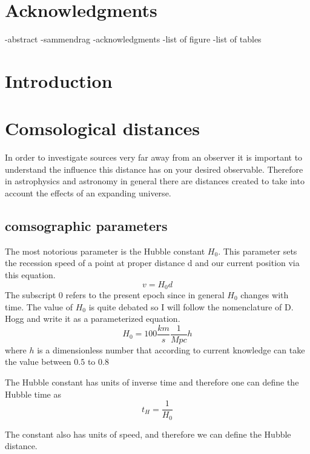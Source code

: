 \documentclass{article}
\begin{document}
\section*{Acknowledgments}
\lipsum[3] %

\newpage
\tableofcontents

\newpage
\listoffigures

\listoftables

-abstract 
-sammendrag
-acknowledgments
-list of figure
-list of tables


\section{Introduction}

\section{Comsological distances}
In order to investigate sources very far away from an observer it is important to understand the influence this distance has on your desired observable. Therefore in astrophysics and astronomy in general there are distances created to take into account the effects of an expanding universe. 


\subsection{comsographic parameters}

The most notorious parameter is the Hubble constant $H_0$. This parameter sets the recession speed of a point at proper distance d and our current position via this equation.
\begin{equation}
    v = H_0 d 
\end{equation}
The subscript $0$ refers to the present epoch since in general $H_0$ changes with time. The value of $H_0$ is quite debated so I will  follow the nomenclature of D. Hogg and write it as a parameterized equation. 
$$
H_0= 100\frac{km}{s}\frac{1}{Mpc} h 
$$
where $h$ is a dimensionless number that according to current knowledge  can take the value between $0.5$ to $0.8$  

The Hubble constant has units of inverse time and therefore one can define the Hubble time as 
$$
t_H = \frac{1}{H_0}
$$


The constant also has units of speed, and therefore we can define the Hubble distance. 
\end{document}
